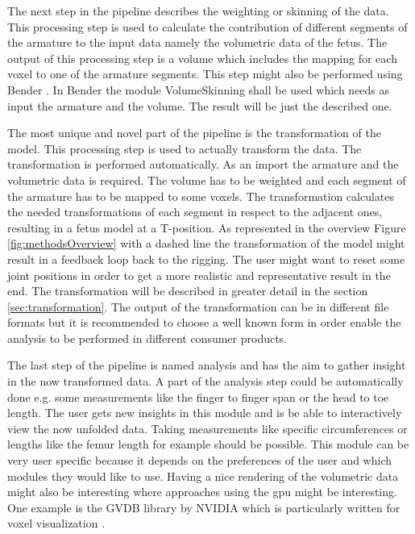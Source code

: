 The next step in the pipeline describes the weighting or skinning of the data. This processing step is used to calculate the contribution of different segments of the armature to the input data namely the volumetric data of the fetus. The output of this processing step is a volume which includes the mapping for each voxel to one of the armature segments. This step might also be performed using Bender \cite{Finet2014Bender:Morphing}. In Bender the module VolumeSkinning shall be used which needs as input the armature and the volume. The result will be just the described one.\newline

The most unique and novel part of the pipeline is the transformation of the model. This processing step is used to actually transform the data. The transformation is performed automatically. As an import the armature and the volumetric data is required. The volume has to be weighted and each segment of the armature has to be mapped to some voxels. The transformation calculates the needed transformations of each segment in respect to the adjacent ones, resulting in a fetus model at a T-position. As represented in the overview Figure \ref{fig:methodsOverview} with a dashed line the transformation of the model might result in a feedback loop back to the rigging. The user might want to reset some joint positions in order to get a more realistic and representative result in the end. The transformation will be described in greater detail in the section \ref{sec:transformation}. The output of the transformation can be in different file formats but it is recommended to choose a well known form in order enable the analysis to be performed in different consumer products.\newline

The last step of the pipeline is named analysis and has the aim to gather insight in the now transformed data. A part of the analysis step could be automatically done e.g. some measurements like the finger to finger span or the head to toe length. The user gets new insights in this module and is be able to interactively view the now unfolded data. Taking measurements like specific circumferences or lengths like the femur length for example should be possible. This module can be very user specific because it depends on the preferences of the user and which modules they would like to use. Having a nice rendering of the volumetric data might also be interesting where approaches using the \gls{gpu} might be interesting. One example is the GVDB library by NVIDIA which is particularly written for voxel visualization \cite{Hoetzlein2016}.

